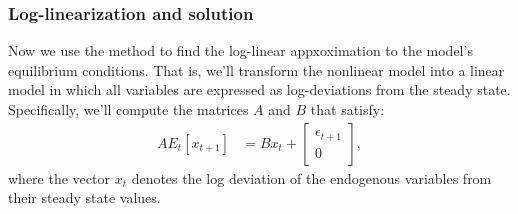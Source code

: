 \documentclass[letterpaper,10pt,openany,oneside,english]{sphinxmanual}
\begin{document}
\subsubsection{Log-linearization and solution}
\label{\detokenize{examples:Log-linearization-and-solution}}
Now we use the  method to find the log-linear
appxoximation to the model's equilibrium conditions. That is, we'll
transform the nonlinear model into a linear model in which all variables
are expressed as log-deviations from the steady state. Specifically,
we'll compute the matrices \(A\) and \(B\) that satisfy:
\label{\detokenize{examples:equation-examples:8}}\label{equation:examples:examples:8}\begin{align}
A E_t\left[ x_{t+1} \right] & = B x_t + \left[ \begin{array}{c} \epsilon_{t+1} \\ 0 \end{array} \right],
\end{align}
where the vector \(x_{t}\) denotes the log deviation of the
endogenous variables from their steady state values.
\end{document}
